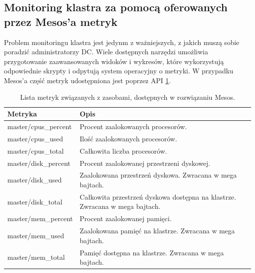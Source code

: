 \documentclass[10pt,a4paper,titlepage,twoside]{report}
\begin{document}
\subsection{Monitoring klastra za pomocą oferowanych przez Mesos'a metryk}
Problem monitoringu klastra jest jedynm z ważniejszych, z jakich muszą sobie poradzić administratorzy DC. Wiele dostępnych narzędzi umożliwia przygotowanie zaawansowanych widoków i wykresów, które wykorzystują odpowiednie skrypty i odpytują system operacyjny o metryki. W przypadku Mesos'a część metryk udostępniona jest poprzez API \ref{mesos_metrics}.

\begin{table}[!htbp]
\caption{Lista metryk związanych z zasobami, dostępnych w rozwiązaniu Mesos.}
\label{mesos_metrics}
\centering
\begin{tabular}{|p{4cm}|p{10cm}|}
  \hline
  \textbf{Metryka} & \textbf{Opis} \\
  \hline
  master/cpus\_percent & Procent zaalokowanych procesorów.\\
  \hline
  master/cpus\_used & Ilość zaalokowanych procesorów. \\
  \hline
  master/cpus\_total & Całkowita liczba procesorów. \\
  \hline
  master/disk\_percent & Procent zaalokowanej przestrzeni dyskowej. \\
  \hline
  master/disk\_used & Zaalokowana przestrzeń dyskowa. Zwracana w mega bajtach. \\
  \hline
  master/disk\_total & Całkowita przestrzeń dyskowa dostępna na klastrze. Zwracana w mega bajtach. \\
  \hline
  master/mem\_percent & Procent zaalokowanej pamięci. \\
  \hline
  master/mem\_used & Zaalokowana pamięć na klastrze. Zwracana w mega bajtach. \\
  \hline
  master/mem\_total & Pamięć dostępna na klastrze. Zwracana w mega bajtach. \\
  \hline
\end{tabular}
\end{table}
\end{document}
